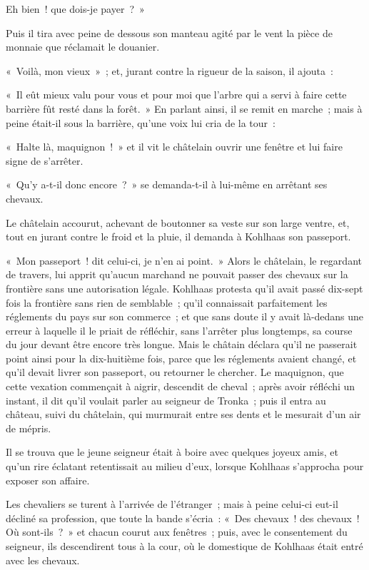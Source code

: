 \documentclass[french,twoside]{book} %
\begin{document}
Eh bien ! que dois-je payer ? »\par
Puis il tira avec peine de dessous son manteau agité par le vent la pièce de monnaie que réclamait le douanier.\par
« Voilà, mon vieux » ; et, jurant contre la rigueur de la saison, il ajouta :\par
« Il eût mieux valu pour vous et pour moi que l’arbre qui a servi à faire cette barrière fût resté dans la forêt. » En parlant ainsi, il se remit en marche ; mais à peine était-il sous la barrière, qu’une voix lui cria de la tour :\par
« Halte là, maquignon ! » et il vit le châtelain ouvrir une fenêtre et lui faire signe de s’arrêter.\par
« Qu’y a-t-il donc encore ? » se demanda-t-il à lui-même en arrêtant ses chevaux.\par
Le châtelain accourut, achevant de boutonner sa veste sur son large ventre, et, tout en jurant contre le froid et la pluie, il demanda à Kohlhaas son passeport.\par
« Mon passeport ! dit celui-ci, je n’en ai point. » Alors le châtelain, le regardant de travers, lui apprit qu’aucun marchand ne pouvait passer des chevaux sur la frontière sans une autorisation légale. Kohlhaas protesta qu’il avait passé dix-sept fois la frontière sans rien de semblable ; qu’il connaissait parfaitement les réglements du pays sur son commerce ; et que sans doute il y avait là-dedans une erreur à laquelle il le priait de réfléchir, sans l’arrêter plus longtemps, sa course du jour devant être encore très longue. Mais le châtain déclara qu’il ne passerait point ainsi pour la dix-huitième fois, parce que les réglements avaient changé, et qu’il devait livrer son passeport, ou retourner le chercher. Le maquignon, que cette vexation commençait à aigrir, descendit de cheval ; après avoir réfléchi un instant, il dit qu’il voulait parler au seigneur de Tronka ; puis il entra au château, suivi du châtelain, qui murmurait entre ses dents et le mesurait d’un air de mépris.\par
Il se trouva que le jeune seigneur était à boire avec quelques joyeux amis, et qu’un rire éclatant retentissait au milieu d’eux, lorsque Kohlhaas s’approcha pour exposer son affaire.\par
Les chevaliers se turent à l’arrivée de l’étranger ; mais à peine celui-ci eut-il décliné sa profession, que toute la bande s’écria : « Des chevaux ! des chevaux ! Où sont-ils ? » et chacun courut aux fenêtres ; puis, avec le consentement du seigneur, ils descendirent tous à la cour, où le domestique de Kohlhaas était entré avec les chevaux.\par
\end{document}
